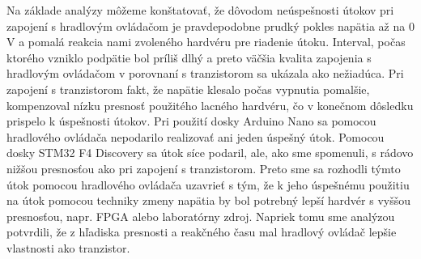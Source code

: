Na základe analýzy môžeme konštatovať, že dôvodom neúspešnosti útokov pri zapojení s hradlovým ovládačom je pravdepodobne prudký pokles napätia až na 0 V a pomalá reakcia nami zvoleného hardvéru pre riadenie útoku. Interval, počas ktorého vzniklo podpätie bol príliš dlhý a preto väčšia kvalita zapojenia s hradlovým ovládačom v porovnaní s tranzistorom sa ukázala ako nežiadúca. Pri zapojení s tranzistorom fakt, že napätie klesalo počas vypnutia pomalšie, kompenzoval nízku presnosť použitého lacného hardvéru, čo v konečnom dôsledku prispelo k úspešnosti útokov. Pri použití dosky Arduino Nano sa pomocou hradlového ovládača nepodarilo realizovať ani jeden úspešný útok. Pomocou dosky STM32 F4 Discovery sa útok síce podaril, ale, ako sme spomenuli, s rádovo nižšou presnosťou ako pri zapojení s tranzistorom. Preto sme sa rozhodli týmto útok pomocou hradlového ovládača uzavrieť s tým, že k jeho úspešnému použitiu na útok pomocou techniky zmeny napätia by bol potrebný lepší hardvér s vyššou presnosťou, napr. FPGA alebo laboratórny zdroj. Napriek tomu sme analýzou potvrdili, že z hľadiska presnosti a reakčného času mal hradlový ovládač lepšie vlastnosti ako tranzistor.